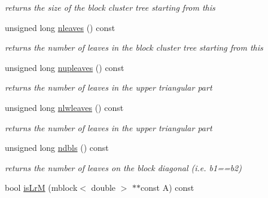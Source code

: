 \begin{DoxyCompactItemize}
\begin{DoxyCompactList}\small\item\em returns the size of the block cluster tree starting from this \end{DoxyCompactList}\item 
\hypertarget{classblcluster_a1394e38612e10a4df82d4eeb185a28d2}{
unsigned long \hyperlink{classblcluster_a1394e38612e10a4df82d4eeb185a28d2}{nleaves} () const }
\label{classblcluster_a1394e38612e10a4df82d4eeb185a28d2}

\begin{DoxyCompactList}\small\item\em returns the number of leaves in the block cluster tree starting from this \end{DoxyCompactList}\item 
\hypertarget{classblcluster_adf139d0dc5e5b670183e75af4e3096b3}{
unsigned long \hyperlink{classblcluster_adf139d0dc5e5b670183e75af4e3096b3}{nupleaves} () const }
\label{classblcluster_adf139d0dc5e5b670183e75af4e3096b3}

\begin{DoxyCompactList}\small\item\em returns the number of leaves in the upper triangular part \end{DoxyCompactList}\item 
\hypertarget{classblcluster_aa2915951b92c5b88a366e7bf92121ec5}{
unsigned long \hyperlink{classblcluster_aa2915951b92c5b88a366e7bf92121ec5}{nlwleaves} () const }
\label{classblcluster_aa2915951b92c5b88a366e7bf92121ec5}

\begin{DoxyCompactList}\small\item\em returns the number of leaves in the upper triangular part \end{DoxyCompactList}\item 
\hypertarget{classblcluster_aa68c3795dbc33734c55cc9137c4decc3}{
unsigned long \hyperlink{classblcluster_aa68c3795dbc33734c55cc9137c4decc3}{ndbls} () const }
\label{classblcluster_aa68c3795dbc33734c55cc9137c4decc3}

\begin{DoxyCompactList}\small\item\em returns the number of leaves on the block diagonal (i.\-e. b1==b2) \end{DoxyCompactList}\item 
\hypertarget{classblcluster_a41d823be1619b8ed38539314ec35bac5}{
bool \hyperlink{classblcluster_a41d823be1619b8ed38539314ec35bac5}{is\-Lr\-M} (mblock$<$ double $>$ $\ast$$\ast$const \-A) const }
\label{classblcluster_a41d823be1619b8ed38539314ec35bac5}


\end{DoxyCompactItemize}
